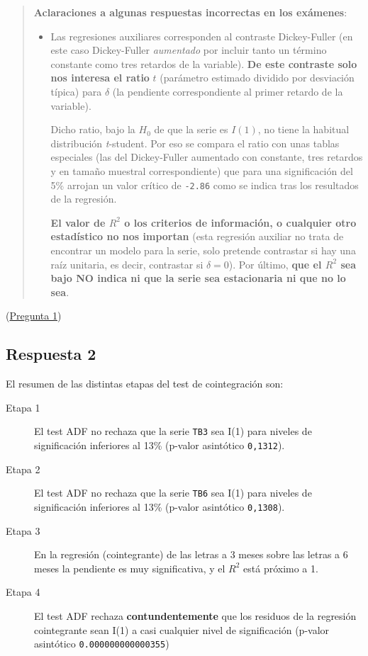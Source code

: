 \documentclass[10pt]{article}
\begin{document}
\begin{quote}
\textbf{Aclaraciones a algunas respuestas incorrectas en los exámenes}:

\begin{itemize}
\item Las regresiones auxiliares corresponden al contraste Dickey-Fuller
(en este caso Dickey-Fuller \emph{aumentado} por incluir tanto un término
constante como tres retardos de la variable). \textbf{De este contraste
solo nos interesa el ratio} \(t\) (parámetro estimado dividido por
desviación típica) para \(\delta\) (la pendiente correspondiente al
primer retardo de la variable). 

Dicho ratio, bajo la \(H_0\) de que la serie es \(I(1)\), no tiene la
habitual distribución \emph{t}-student. Por eso se compara el ratio con
unas tablas especiales (las del Dickey-Fuller aumentado con
constante, tres retardos y en tamaño muestral correspondiente) que
para una significación del 5\% arrojan un valor crítico de \texttt{-2.86}
como se indica tras los resultados de la regresión.

\textbf{El valor de \(R^2\) o los criterios de información, o cualquier otro
estadístico no nos importan} (esta regresión auxiliar no trata de
encontrar un modelo para la serie, solo pretende contrastar si hay
una raíz unitaria, es decir, contrastar si \(\delta=0\)). Por último,
\textbf{que el \(R^2\) sea bajo NO indica ni que la serie sea estacionaria ni
que no lo sea}.
\end{itemize}
\end{quote}


(\hyperref[sec:orge0eda41]{Pregunta 1})
\subsection*{Respuesta 2}
\label{sec:orga3ba9ba}

El resumen de las distintas etapas del test de cointegración son:
\begin{description}
\item[{Etapa 1}] El test ADF no rechaza que la serie \texttt{TB3} sea
I(1) para niveles de significación inferiores al 13\% (p-valor
asintótico \texttt{0,1312}).
\item[{Etapa 2}] El test ADF no rechaza que la serie \texttt{TB6} sea
I(1) para niveles de significación inferiores al 13\% (p-valor
asintótico \texttt{0,1308}).
\item[{Etapa 3}] En la regresión (cointegrante) de las letras a 3 meses
sobre las letras a 6 meses la pendiente es muy significativa, y el
\(R^2\) está próximo a 1.
\item[{Etapa 4}] El test ADF rechaza \textbf{contundentemente} que los residuos
de la regresión cointegrante sean I(1) a casi cualquier nivel
de significación (p-valor asintótico \texttt{0.000000000000355})
\end{description}
\end{document}
